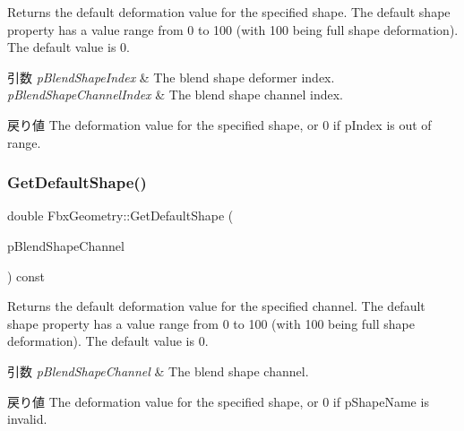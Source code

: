 Returns the default deformation value for the specified shape. The default shape property has a value range from 0 to 100 (with 100 being full shape deformation). The default value is 0. 
\begin{DoxyParams}{引数}
{\em p\+Blend\+Shape\+Index} & The blend shape deformer index. \\
\hline
{\em p\+Blend\+Shape\+Channel\+Index} & The blend shape channel index. \\
\hline
\end{DoxyParams}
\begin{DoxyReturn}{戻り値}
The deformation value for the specified shape, or 0 if p\+Index is out of range. 
\end{DoxyReturn}
\mbox{\label{class_fbx_geometry_a178e8125306a0e7bb66f71e5472d381f}} 
\subsubsection{\texorpdfstring{Get\+Default\+Shape()}{GetDefaultShape()}\hspace{0.1cm}{\footnotesize\ttfamily [2/2]}}
{\footnotesize\ttfamily double Fbx\+Geometry\+::\+Get\+Default\+Shape (\begin{DoxyParamCaption}\item[{\hyperlink{class_fbx_blend_shape_channel}{Fbx\+Blend\+Shape\+Channel} $\ast$}]{p\+Blend\+Shape\+Channel }\end{DoxyParamCaption}) const}

Returns the default deformation value for the specified channel. The default shape property has a value range from 0 to 100 (with 100 being full shape deformation). The default value is 0. 
\begin{DoxyParams}{引数}
{\em p\+Blend\+Shape\+Channel} & The blend shape channel. \\
\hline
\end{DoxyParams}
\begin{DoxyReturn}{戻り値}
The deformation value for the specified shape, or 0 if p\+Shape\+Name is invalid. 
\end{DoxyReturn}
\mbox{\label{class_fbx_geometry_a3a6bd565c4a5a3a8b5daa3b653cc8a0a}} 
